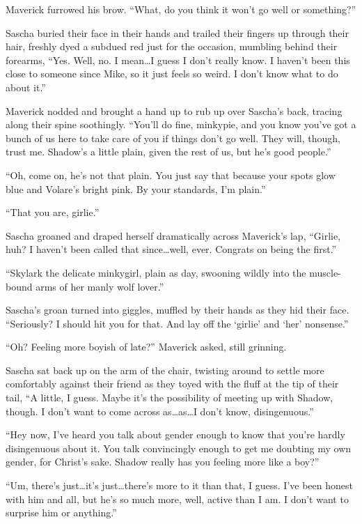 Maverick furrowed his brow. ``What, do you think it won't go well or something?''

Sascha buried their face in their hands and trailed their fingers up through their hair, freshly dyed a subdued red just for the occasion, mumbling behind their forearms, ``Yes. Well, no. I mean\ldots{}I guess I don't really know. I haven't been this close to someone since Mike, so it just feels so weird. I don't know what to do about it.''

Maverick nodded and brought a hand up to rub up over Sascha's back, tracing along their spine soothingly. ``You'll do fine, minkypie, and you know you've got a bunch of us here to take care of you if things don't go well. They will, though, trust me. Shadow's a little plain, given the rest of us, but he's good people.''

``Oh, come on, he's not that plain. You just say that because your spots glow blue and Volare's bright pink. By your standards, I'm plain.''

``That you are, girlie.''

Sascha groaned and draped herself dramatically across Maverick's lap, ``Girlie, huh? I haven't been called that since\ldots{}well, ever. Congrats on being the first.''

``Skylark the delicate minkygirl, plain as day, swooning wildly into the muscle-bound arms of her manly wolf lover.''

Sascha's groan turned into giggles, muffled by their hands as they hid their face. ``Seriously? I should hit you for that. And lay off the `girlie' and `her' nonsense.''

``Oh? Feeling more boyish of late?'' Maverick asked, still grinning.

Sascha sat back up on the arm of the chair, twisting around to settle more comfortably against their friend as they toyed with the fluff at the tip of their tail, ``A little, I guess. Maybe it's the possibility of meeting up with Shadow, though. I don't want to come across as\ldots{}as\ldots{}I don't know, disingenuous.''

``Hey now, I've heard you talk about gender enough to know that you're hardly disingenuous about it. You talk convincingly enough to get me doubting my own gender, for Christ's sake. Shadow really has you feeling more like a boy?''

``Um, there's just\ldots{}it's just\ldots{}there's more to it than that, I guess. I've been honest with him and all, but he's so much more, well, active than I am. I don't want to surprise him or anything.''

